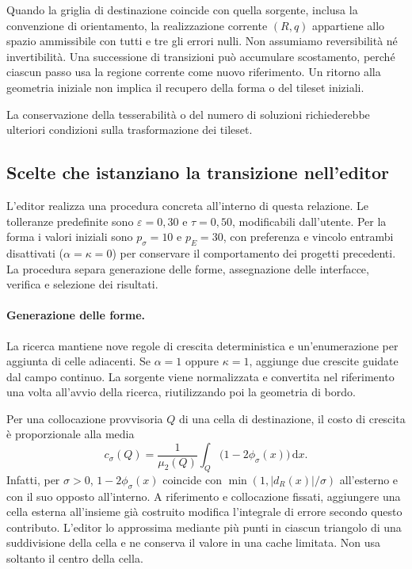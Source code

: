 \documentclass[11pt,a4paper]{article}
\begin{document}
Quando la griglia di destinazione coincide con quella sorgente, inclusa la convenzione di orientamento, la realizzazione corrente $(R,q)$ appartiene allo spazio ammissibile con tutti e tre gli errori nulli. Non assumiamo reversibilità né invertibilità. Una successione di transizioni può accumulare scostamento, perché ciascun passo usa la regione corrente come nuovo riferimento. Un ritorno alla geometria iniziale non implica il recupero della forma o del tileset iniziali.

La conservazione della tesserabilità o del numero di soluzioni richiederebbe ulteriori condizioni sulla trasformazione dei tileset.

\subsection{Scelte che istanziano la transizione nell'editor}

L'editor realizza una procedura concreta all'interno di questa relazione. Le tolleranze predefinite sono $\varepsilon=0{,}30$ e $\tau=0{,}50$, modificabili dall'utente. Per la forma i valori iniziali sono $p_\sigma=10$ e $p_E=30$, con preferenza e vincolo entrambi disattivati ($\alpha=\kappa=0$) per conservare il comportamento dei progetti precedenti. La procedura separa generazione delle forme, assegnazione delle interfacce, verifica e selezione dei risultati.

\paragraph{Generazione delle forme.}
La ricerca mantiene nove regole di crescita deterministica e un'enumerazione per aggiunta di celle adiacenti. Se $\alpha=1$ oppure $\kappa=1$, aggiunge due crescite guidate dal campo continuo. La sorgente viene normalizzata e convertita nel riferimento una volta all'avvio della ricerca, riutilizzando poi la geometria di bordo.

Per una collocazione provvisoria $Q$ di una cella di destinazione, il costo di crescita è proporzionale alla media
\[
c_\sigma(Q)=\frac{1}{\mu_2(Q)}\int_Q\bigl(1-2\phi_\sigma(x)\bigr)\,\mathrm dx.
\]
Infatti, per $\sigma>0$, $1-2\phi_\sigma(x)$ coincide con $\min(1,|d_R(x)|/\sigma)$ all'esterno e con il suo opposto all'interno. A riferimento e collocazione fissati, aggiungere una cella esterna all'insieme già costruito modifica l'integrale di errore secondo questo contributo. L'editor lo approssima mediante più punti in ciascun triangolo di una suddivisione della cella e ne conserva il valore in una cache limitata. Non usa soltanto il centro della cella.
\end{document}
